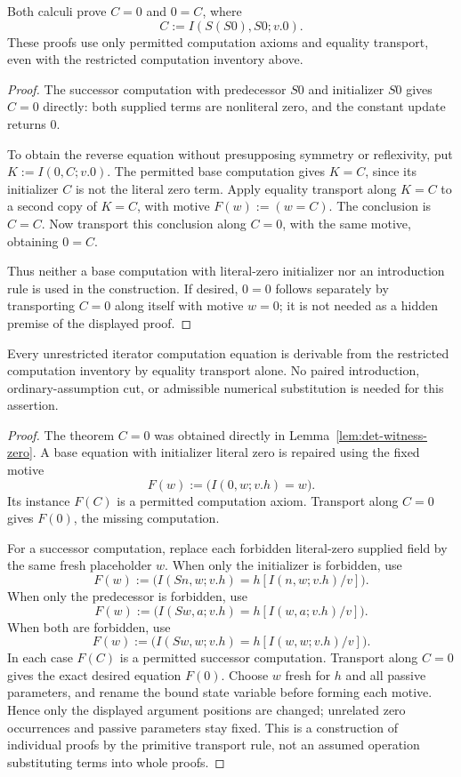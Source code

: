 \begin{lemma}
\label{lem:det-witness-zero}
Both calculi prove $C=0$ and $0=C$, where
\[
 C:=I(S(S0),S0;v.0).
\]
These proofs use only permitted computation axioms and equality
transport, even with the restricted computation inventory above.
\end{lemma}
\begin{proof}
The successor computation with predecessor $S0$ and initializer $S0$
gives $C=0$ directly: both supplied terms are nonliteral zero, and the
constant update returns $0$.

To obtain the reverse equation without presupposing symmetry or
reflexivity, put $K:=I(0,C;v.0)$.  The permitted base computation gives
$K=C$, since its initializer $C$ is not the literal zero term.  Apply
equality transport along $K=C$ to a second copy of $K=C$, with motive
$F(w):=(w=C)$.  The conclusion is $C=C$.  Now transport this conclusion
along $C=0$, with the same motive, obtaining $0=C$.

Thus neither a base computation with literal-zero initializer nor an
introduction rule is used in the construction.  If desired, $0=0$
follows separately by transporting $C=0$ along itself with motive
$w=0$; it is not needed as a hidden premise of the displayed proof.
\end{proof}

\begin{lemma}
\label{lem:det-witness-computation-repair}
Every unrestricted iterator computation equation is derivable from the
restricted computation inventory by equality transport alone.  No
paired introduction, ordinary-assumption cut, or admissible numerical
substitution is needed for this assertion.
\end{lemma}
\begin{proof}
The theorem $C=0$ was obtained directly in
Lemma~\ref{lem:det-witness-zero}.  A base equation with initializer
literal zero is repaired using the fixed motive
\[
 F(w):=\bigl(I(0,w;v.h)=w\bigr).
\]
Its instance $F(C)$ is a permitted computation axiom.  Transport along
$C=0$ gives $F(0)$, the missing computation.

For a successor computation, replace each forbidden literal-zero
supplied field by the same fresh placeholder $w$.  When only the
initializer is forbidden, use
\[
 F(w):=\bigl(I(Sn,w;v.h)=h[I(n,w;v.h)/v]\bigr).
\]
When only the predecessor is forbidden, use
\[
 F(w):=\bigl(I(Sw,a;v.h)=h[I(w,a;v.h)/v]\bigr).
\]
When both are forbidden, use
\[
 F(w):=\bigl(I(Sw,w;v.h)=h[I(w,w;v.h)/v]\bigr).
\]
In each case $F(C)$ is a permitted successor computation.  Transport
along $C=0$ gives the exact desired equation $F(0)$.  Choose $w$ fresh
for $h$ and all passive parameters, and rename the bound state variable
before forming each motive.  Hence only the displayed argument positions
are changed; unrelated zero occurrences and passive parameters stay fixed.
This is a construction of individual proofs by the primitive transport
rule, not an assumed operation substituting terms into whole proofs.
\end{proof}


